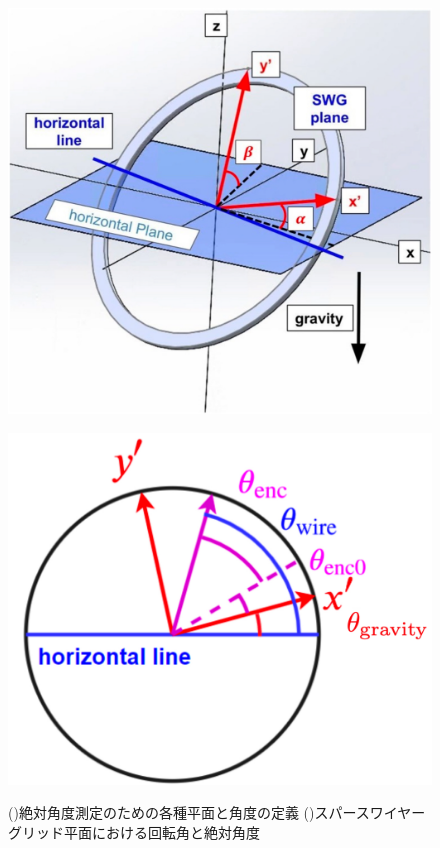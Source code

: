 \documentclass[../../main.tex]{subfiles}
\begin{document}
\begin{figure}[tbp]
    \begin{minipage}[b]{0.48\columnwidth}
        \centering
        \includegraphics[width=\columnwidth]{wiregrid/abs_angle_overview.pdf}
        \subcaption{}
        \label{fig:abs_angle_overview}
    \end{minipage}
    \hspace{0.06\columnwidth}
    \begin{minipage}[b]{0.40\columnwidth}
        \centering
        \includegraphics[width=\columnwidth]{wiregrid/abs_angle_WG_plane2.png}
        \subcaption{}
        \label{fig:abs_angle_WG_plane}
    \end{minipage}
    \caption{()絶対角度測定のための各種平面と角度の定義 ()スパースワイヤーグリッド平面における回転角と絶対角度}
    \label{fig:abs_angle}
\end{figure}
\end{document}
